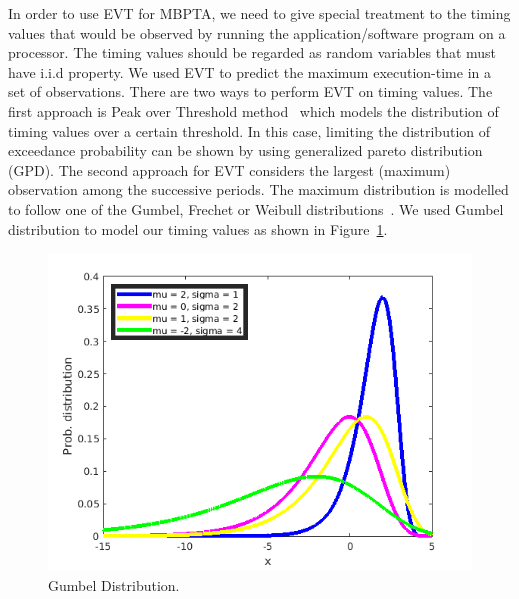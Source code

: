 In order to use EVT for MBPTA, we need to give special treatment to the timing values that would be observed by running the application/software program on a processor. The timing values should be regarded as random variables that must have i.i.d property.  We used EVT to predict the maximum execution-time in a set of observations. There are two ways to perform EVT on timing values. The first approach is Peak over Threshold method~\cite{cazorla2013upper} which models the distribution of timing values over a certain threshold. In this case, limiting the distribution of exceedance probability can be shown by using generalized pareto distribution (GPD). The second approach for EVT considers the largest (maximum) observation among the successive periods. The maximum distribution is modelled to follow one of the Gumbel, Frechet or Weibull distributions~\cite{gumbel1954statistical}. We used Gumbel distribution to model our timing values as shown in Figure~\ref{gumbel}.

\begin{figure}[tb!]
\centering
\includegraphics[scale=1]{figures/gumbel.png}
\caption{Gumbel Distribution.}
\label{gumbel}
\end{figure}





